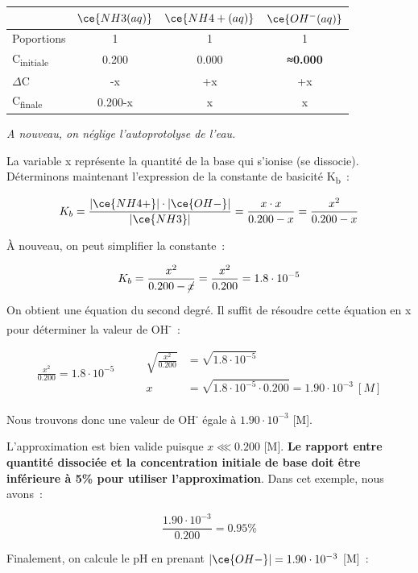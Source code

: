\documentclass[
  11pt,
  a4paper,
  openany]{book}
\begin{document}
\begin{longtable}[]{@{}lccc@{}}
\toprule()
& \(\ce{NH3(aq)}\) & \(\ce{NH4+(aq)}\) & \(\ce{OH^{-}(aq)}\) \\
\midrule()
\endhead
Poportions & 1 & 1 & 1 \\
C\textsubscript{initiale} & 0.200 & 0.000 & \textbf{≈0.000} \\
\(\Delta\)C & -x & +x & +x \\
C\textsubscript{finale} & 0.200-x & x & x \\
\bottomrule()
\end{longtable}

\emph{A nouveau, on néglige l'autoprotolyse de l'eau.}

La variable x représente la quantité de la base qui s'ionise (se dissocie). Déterminons maintenant l'expression de la constante de basicité K\textsubscript{b}~:

\[
K_b = \frac{|\ce{NH4+}| \cdot |\ce{OH-}|}{|\ce{NH3}|} = \frac{x \cdot x}{0.200 - x} = \frac{x^2}{0.200 - x}
\]

À nouveau, on peut simplifier la constante~:

\[
K_b = \frac{x^2}{0.200 - \cancel{x}} = \frac{x^2}{0.200} = 1.8 \cdot 10^{-5}
\]

On obtient une équation du second degré. Il suffit de résoudre cette équation en x pour déterminer la valeur de \textbar OH\textsuperscript{-}\textbar~:

\[
\begin{split}
\frac{x^2}{0.200} = 1.8 \cdot 10^{-5}
\end{split}
\qquad
\begin{split}
\sqrt{\frac{x^2}{0.200}} &= \sqrt{1.8 \cdot 10^{-5}} \\
x &= \sqrt{1.8 \cdot 10^{-5} \cdot 0.200} = 1.90 \cdot 10^{-3}\ [M]
\end{split}
\]

Nous trouvons donc une valeur de \textbar OH\textsuperscript{-}\textbar{} égale à \(1.90 \cdot 10^{-3}\) {[}M{]}.

L'approximation est bien valide puisque \(x \lll 0.200\) {[}M{]}. \textbf{Le rapport entre quantité dissociée et la concentration initiale de base doit être inférieure à 5\% pour utiliser l'approximation}. Dans cet exemple, nous avons~:

\[
\frac{1.90 \cdot 10^{-3}}{0.200} = 0.95\%
\]

Finalement, on calcule le pH en prenant \(|\ce{OH-}| = 1.90 \cdot 10^{-3}\) {[}M{]}~:
\end{document}

